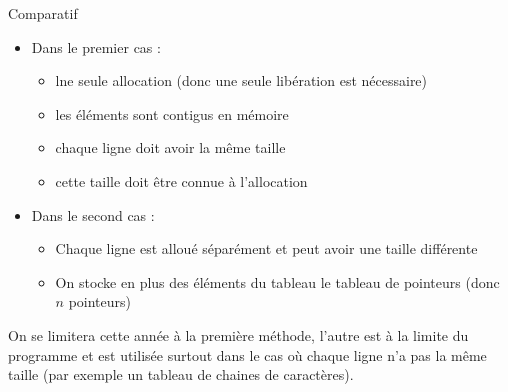\documentclass[10pt]{beamer}
\begin{document}
\begin{frame}{\Ctitle}{\stitle}
	\begin{block}{Comparatif}
		\begin{itemize}
			\item<1-> Dans le premier cas :
			\begin{itemize}
				\item<2-> lne seule allocation (donc une seule libération est nécessaire)
				\item<3-> les éléments sont contigus en mémoire
				\item<4-> chaque ligne doit avoir la même taille
				\item<5-> cette taille doit être connue à l'allocation
			\end{itemize}
			\item<6-> Dans le second cas :
			\begin{itemize}
				\item<6-> Chaque ligne est alloué séparément et peut avoir une taille différente				
				\item<7-> On stocke en plus des éléments du tableau le tableau de pointeurs (donc $n$ pointeurs)
			\end{itemize}
		\end{itemize}
		\textcolor{BrickRed}{\small \danger \;} On se limitera cette année à la première méthode, l'autre est à la limite du programme et est utilisée surtout dans le cas où chaque ligne n'a pas la même taille (par exemple un tableau de chaines de caractères).
	\end{block}
\end{frame}
\end{document}
